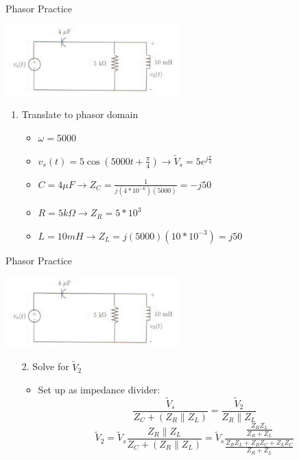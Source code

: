     \begin{frame}{Phasor Practice}
        \begin{center}
            \includegraphics[width=0.5\textwidth]{./images/phasor-practice.png}
        \end{center}
        \begin{enumerate}
            \item Translate to phasor domain
            \begin{itemize}
                \item $\omega=5000$
                \item $v_s(t)=5\cos(5000t+\frac{\pi}{4})\rightarrow \tilde{V}_s=5e^{j\frac{\pi}{4}}$
                \item $C=4\mu F\rightarrow Z_C=\frac{1}{j(4*10^{-6})(5000)}=-j50$
                \item $R=5k\Omega\rightarrow Z_R=5*10^3$
                \item $L=10mH\rightarrow Z_L=j(5000)(10*10^{-3})=j50$
            \end{itemize}
        \end{enumerate}
    \end{frame}
    
    \begin{frame}{Phasor Practice}
        \begin{center}
            \includegraphics[width=0.5\textwidth]{./images/phasor-practice.png}
        \end{center}
        \begin{enumerate}
            \item[2.] Solve for $\tilde{V}_2$
            \begin{itemize}
                \item Set up as impedance divider: $$\frac{\tilde{V}_s}{Z_C+(Z_R\| Z_L)}=\frac{\tilde{V}_2}{Z_R\| Z_L}$$
                $$\tilde{V}_2=\tilde{V}_s\frac{Z_R\|Z_L}{Z_C+(Z_R\|Z_L)}=\tilde{V}_s\frac{\frac{Z_RZ_L}{Z_R+Z_L}}{\frac{Z_RZ_L+Z_RZ_C+Z_LZ_C}{Z_R+Z_L}}$$
            \end{itemize}
        \end{enumerate}
    \end{frame}
    
